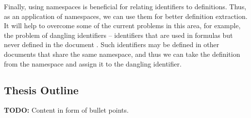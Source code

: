 
Finally, using namespaces is beneficial for relating identifiers to 
definitions. Thus, as an application of namespaces, we can use them for better 
definition extraction. It will help to overcome some of the current problems in this area, 
for example, the problem of dangling identifiers -- identifiers that are used in formulas but never defined in the document \cite{pagael2014mlp}. Such identifiers may be defined in other 
documents that share the same namespace, and thus we can take the definition from the namespace and assign it to the dangling identifier.




\subsection{Thesis Outline}


\textbf{TODO:} Content in form of bullet points.

